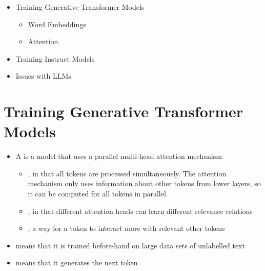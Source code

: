 \documentclass[25pt,a4paper,landscape,headrule,footrule,xetex]{foils}
\begin{document}
%

\maketitle
\makexeCJKinactive

%


\begin{itemize}
\item Training Generative Transformer Models
  \begin{itemize}
  \item Word Embeddings
  \item Attention
  \end{itemize}
\item Training Instruct Models
\item Issues with LLMs
  
\end{itemize}


\section{Training  Generative Transformer Models}


\begin{itemize}
\item A  is a model that uses a parallel multi-head attention mechanism
  \begin{itemize}
  \item {}, in that all tokens are processed simultaneously.
    The attention mechanism only uses information about other tokens
    from lower layers, so it can be computed for all tokens in
    parallel.
  \item {}, in that different attention heads can learn different relevance relations
  \item {}, a way for a token to interact more with relevant other tokens 
  \end{itemize}
\item {} means that it is trained before-hand on large data sets of unlabelled text
\item {}  means that it generates the next token
\end{itemize}
\end{document}
